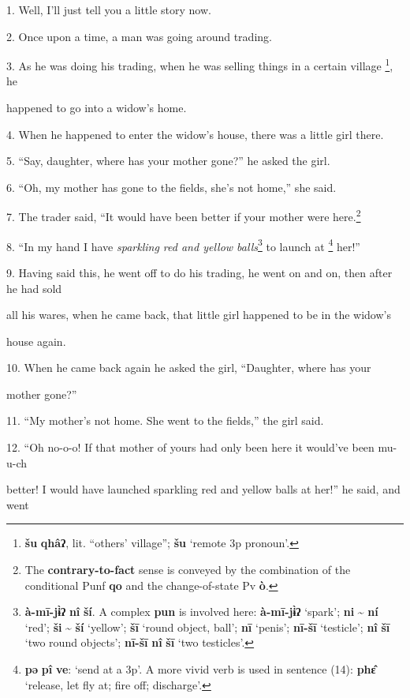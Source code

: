 \setcounter{footnote}{0}

1. Well, I'll just tell you a little story now.

2. Once upon a time, a man was going around trading.

3. As he was doing his trading, when he was selling things in a certain village
\footnote{\textbf{šu} \textbf{qhâʔ}, lit. ``others' village''; \textbf{šu} `remote 3p pronoun'.}, he

happened to go into a widow's home.

4. When he happened to enter the widow's house, there was a little girl there.

5. ``Say, daughter, where has your mother gone?'' he asked the girl.

6. ``Oh, my mother has gone to the fields, she's not home,'' she said.

7. The trader said, ``It would have been better if your mother were here.\footnote{The \textbf{contrary-to-fact} sense is conveyed by the combination of the conditional Punf \textbf{qo} and the change-of-state Pv \textbf{ò}.}

8. ``In my hand I have \textit{sparkling red and yellow balls}\footnote{\textbf{à-mī-jɨ̀ʔ} \textbf{nî} \textbf{ší}. A complex \textbf{pun} is involved here: \textbf{à-mī-jɨ̀ʔ} `spark'; \textbf{ni} \textasciitilde{} \textbf{ní} `red'; \textbf{ši} \textasciitilde{} \textbf{ší} `yellow'; \textbf{šī} `round object, ball'; \textbf{nī} `penis'; \textbf{nī-šī} `testicle'; \textbf{nî} \textbf{šī} `two round objects'; \textbf{nī-šī} \textbf{nî} \textbf{šī} `two testicles'.} to launch at
\footnote{\textbf{pə} \textbf{pî} \textbf{ve}: `send at a 3p'. A more vivid verb is used in sentence (14): \textbf{phɛ̂} `release, let fly at; fire off; discharge'.} her!''

9. Having said this, he went off to do his trading, he went on and on, then after
he had sold

all his wares, when he came back, that little girl happened to be in the widow's


house again.

10. When he came back again he asked the girl, ``Daughter, where has your


mother gone?''

11. ``My mother's not home. She went to the fields,'' the girl said.

12. ``Oh no-o-o! If that mother of yours had only been here it would've been mu-u-ch


better! I would have launched sparkling red and yellow balls at her!'' he said,
and went


